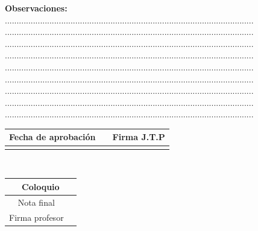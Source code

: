 \documentclass[10pt,spanish,a4paper,openany,notitlepage]{article}
\begin{document}
\begin{titlepage}
\begin{center}
\vspace{9mm}
{\bf Observaciones:}\\
..........................................................................................................\\
..........................................................................................................\\
..........................................................................................................\\
..........................................................................................................\\
..........................................................................................................\\
..........................................................................................................\\
..........................................................................................................\\
..........................................................................................................\\
..........................................................................................................\\

\vspace{10mm}

\begin{tabular}{|c|c|c|c|c|}
\hline
\multicolumn{3}{|c|}{Fecha de aprobación} & \hspace{10mm} & Firma J.T.P\\
\hline
\hspace{10mm} & \hspace{10mm} & \hspace{10mm} &&\\
\hline
\end{tabular}
\-\\
\vspace{10mm}
\begin{tabular}{|c|c|}
\hline
\multicolumn{2}{|c|}{Coloquio}\\
\hline
Nota final&\hspace{2cm} \\
\hline
Firma profesor&\hspace{2cm} \\
\hline
\end{tabular}
\end{center}
\end{titlepage}
\newpage
\end{document}
